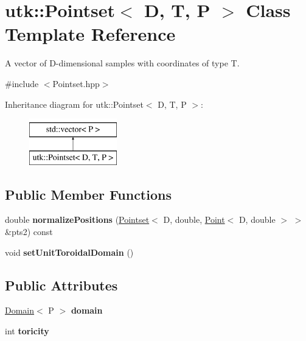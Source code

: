 \hypertarget{classutk_1_1Pointset}{\section{utk\-:\-:Pointset$<$ D, T, P $>$ Class Template Reference}
\label{classutk_1_1Pointset}
}


A vector of D-\/dimensional samples with coordinates of type T.  




{\ttfamily \#include $<$Pointset.\-hpp$>$}

Inheritance diagram for utk\-:\-:Pointset$<$ D, T, P $>$\-:\begin{figure}[H]
\begin{center}
\leavevmode
\includegraphics[height=2.000000cm]{classutk_1_1Pointset}
\end{center}
\end{figure}
\subsection*{Public Member Functions}
\begin{DoxyCompactItemize}
\item 
\hypertarget{classutk_1_1Pointset_ac112d4c6ebce6c272d33da5bb57581fe}{double {\bfseries normalize\-Positions} (\hyperlink{classutk_1_1Pointset}{Pointset}$<$ D, double, \hyperlink{classutk_1_1Point}{Point}$<$ D, double $>$ $>$ \&pts2) const }\label{classutk_1_1Pointset_ac112d4c6ebce6c272d33da5bb57581fe}

\item 
\hypertarget{classutk_1_1Pointset_aa7732906b330fcb54e490427452a4255}{void {\bfseries set\-Unit\-Toroidal\-Domain} ()}\label{classutk_1_1Pointset_aa7732906b330fcb54e490427452a4255}

\end{DoxyCompactItemize}
\subsection*{Public Attributes}
\begin{DoxyCompactItemize}
\item 
\hypertarget{classutk_1_1Pointset_ae699b217e6196dd9f235dd98bd78bb56}{\hyperlink{structutk_1_1Domain}{Domain}$<$ P $>$ {\bfseries domain}}\label{classutk_1_1Pointset_ae699b217e6196dd9f235dd98bd78bb56}

\item 
\hypertarget{classutk_1_1Pointset_adc0cf94fe3594f9e61e9580962d66039}{int {\bfseries toricity}}\label{classutk_1_1Pointset_adc0cf94fe3594f9e61e9580962d66039}

\end{DoxyCompactItemize}


